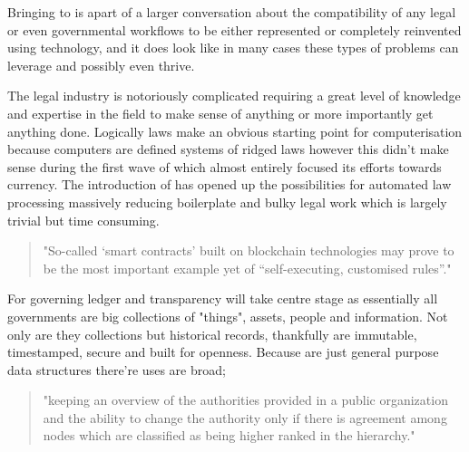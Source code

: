 Bringing  to  is apart of a larger conversation about the compatibility of any legal or even governmental workflows to be either represented or completely reinvented using  technology, and it does look like in many cases these types of problems can leverage  and possibly even thrive.

The legal industry is notoriously complicated requiring a great level of knowledge and expertise in the field to make sense of anything or more importantly get anything done. Logically laws make an obvious starting point for computerisation because computers are defined systems of ridged laws however this didn't make sense during the first wave of  which almost entirely focused its efforts towards currency. The introduction of  has opened up the possibilities for automated law processing massively reducing boilerplate and bulky legal work which is largely trivial but time consuming.

\begin{quote}
	"So-called ‘smart contracts’ built on blockchain technologies may prove to be the most important example yet of “self-executing, customised rules”." \cite{MILLARD2018843}
\end{quote}

For governing  ledger and transparency will take centre stage as essentially all governments are big collections of "things", assets, people and information. Not only are they collections but historical records, thankfully  are immutable, timestamped, secure and built for openness. Because  are just general purpose data structures there're uses are broad; \begin{quote}"keeping an overview of the authorities provided in a public organization and the ability to change the authority only if there is agreement among nodes which are classified as being higher ranked in the hierarchy." \cite{OLNES2017355}\end{quote}


